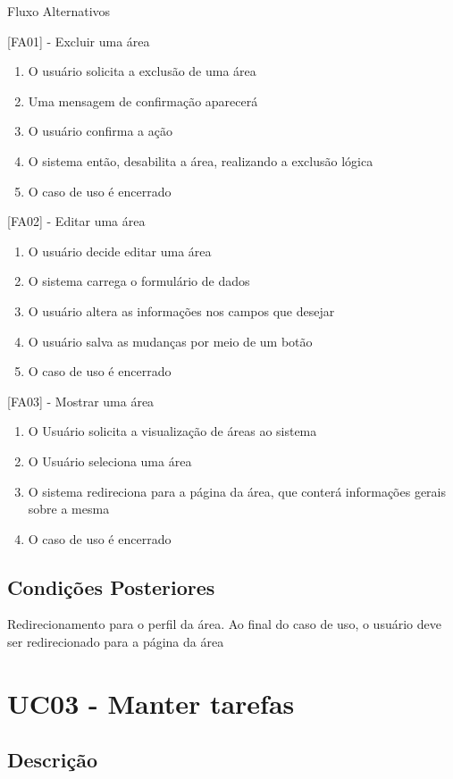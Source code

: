 Fluxo Alternativos

[FA01] - Excluir uma área
\begin{enumerate}
  \item{O usuário solicita a exclusão de uma área}
  \item{Uma mensagem de confirmação aparecerá}
  \item{O usuário confirma a ação}
  \item{O sistema então, desabilita a área, realizando a exclusão lógica}
  \item{O caso de uso é encerrado}
\end{enumerate}


[FA02] - Editar uma área
\begin{enumerate}
  \item{O usuário decide editar uma área}
  \item{O sistema carrega o formulário de dados}
  \item{O usuário altera as informações nos campos que desejar}
  \item{O usuário salva as mudanças por meio de um botão}
  \item{O caso de uso é encerrado}
\end{enumerate}


[FA03] - Mostrar uma área
\begin{enumerate}
  \item{O Usuário solicita a visualização de áreas ao sistema}
  \item{O Usuário seleciona uma área}
  \item{O sistema redireciona para a página da área, que conterá informações gerais sobre a mesma}
  \item{O caso de uso é encerrado}
\end{enumerate}


\subsection{Condições Posteriores}

Redirecionamento para o perfil da área. Ao final do caso de uso, o usuário deve ser redirecionado para a página da área


\section{UC03 - Manter tarefas}

\subsection{Descrição}

